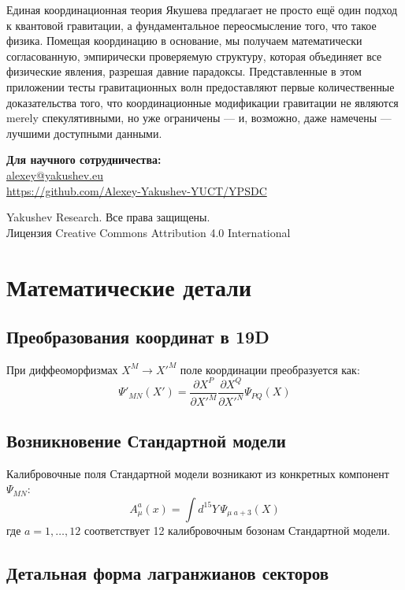 \documentclass[12pt,a4paper]{article}
\theoremstyle{remark}
\begin{document}
	Единая координационная теория Якушева предлагает не просто ещё один подход к квантовой гравитации, а фундаментальное переосмысление того, что такое физика. Помещая координацию в основание, мы получаем математически согласованную, эмпирически проверяемую структуру, которая объединяет все физические явления, разрешая давние парадоксы. Представленные в этом приложении тесты гравитационных волн предоставляют первые количественные доказательства того, что координационные модификации гравитации не являются merely спекулятивными, но уже ограничены — и, возможно, даже намечены — лучшими доступными данными.
	
	\begin{center}
		\vspace{1cm}
		\textbf{Для научного сотрудничества:}\\
		\url{alexey@yakushev.eu}\\
		\url{https://github.com/Alexey-Yakushev-YUCT/YPSDC}
		
		\vspace{0.5cm}
		 Yakushev Research. Все права защищены.\\
		Лицензия Creative Commons Attribution 4.0 International
	\end{center}
	
	\appendix
	\section{Математические детали}
	\label{app:math-details}
	
	\subsection{Преобразования координат в 19D}
	
	При диффеоморфизмах $X^M \to X'^M$ поле координации преобразуется как:
	\[
	\Psi'_{MN}(X') = \frac{\partial X^P}{\partial X'^M} \frac{\partial X^Q}{\partial X'^N} \Psi_{PQ}(X)
	\]
	
	\subsection{Возникновение Стандартной модели}
	
	Калибровочные поля Стандартной модели возникают из конкретных компонент $\Psi_{MN}$:
	\[
	A_\mu^a(x) = \int d^{15}Y \, \Psi_{\mu\;a+3}(X)
	\]
	где $a=1,\dots,12$ соответствует 12 калибровочным бозонам Стандартной модели.
	
	\subsection{Детальная форма лагранжианов секторов}
	
\end{document}
